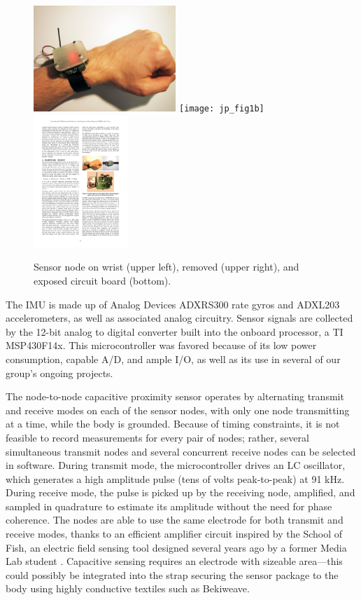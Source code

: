 \begin{figure}[t]
\centering
\includegraphics[height=40mm]{jp_fig1a} \texttt{[image: jp\_fig1b]}
\includegraphics[height=50mm]{jp_fig1c}
\caption{Sensor node on wrist (upper left), removed (upper right), and exposed circuit board (bottom).}
\label{Aylward:fig:1} 
\end{figure}

 The IMU is made up of Analog Devices ADXRS300 rate gyros and ADXL203 accelerometers, as well as associated analog circuitry. Sensor signals are collected by the 12-bit analog to digital converter built into the onboard processor, a TI MSP430F14x. This microcontroller was favored because of its low power consumption, capable A/D, and ample I/O, as well as its use in several of our group's ongoing projects.

The node-to-node capacitive proximity sensor operates by alternating transmit and receive modes on each of the sensor nodes, with only one node transmitting at a time, while the body is grounded. Because of timing constraints, it is not feasible to record measurements for every pair of nodes; rather, several simultaneous transmit nodes and several concurrent receive nodes can be selected in software. During transmit mode, the microcontroller drives an LC oscillator, which generates a high amplitude pulse (tens of volts peak-to-peak) at 91 kHz. During receive mode, the pulse is picked up by the receiving node, amplified, and sampled in quadrature to estimate its amplitude without the need for phase coherence. The nodes are able to use the same electrode for both transmit and receive modes, thanks to an efficient amplifier circuit inspired by the School of Fish, an electric field sensing tool designed several years ago by a former Media Lab student \cite{Smith:1999}. Capacitive sensing requires an electrode with sizeable area---this could possibly be integrated into the strap securing the sensor package to the body using highly conductive textiles such as Bekiweave.%

